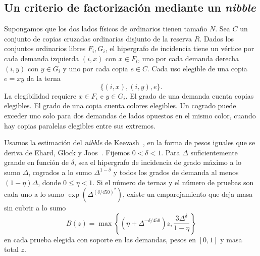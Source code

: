 \subsection{Un criterio de factorización mediante un \emph{nibble}}

Supongamos que los dos lados físicos de ordinarios tienen tamaño \(N\). Sea \(C\) un conjunto de copias cruzadas ordinarias disjunto de la reserva \(R\). Dados los conjuntos ordinarios libres \(F_i,G_i\), el hipergrafo de incidencia tiene un vértice por cada demanda izquierda \((i,x)\) con \(x\in F_i\), uno por cada demanda derecha \((i,y)\) con \(y\in G_i\) y uno por cada copia \(e\in C\). Cada uso elegible de una copia \(e=xy\) da la terna
\[
 \{(i,x),(i,y),e\}.
\]
La elegibilidad requiere \(x\in F_i\) e \(y\in G_i\). El grado de una demanda cuenta copias elegibles. El grado de una copia cuenta colores elegibles. Un cogrado puede exceder uno solo para dos demandas de lados opuestos en el mismo color, cuando hay copias paralelas elegibles entre sus extremos.

Usamos la estimación del \emph{nibble} de Keevash~\cite[Sección~3.1]{KeevashII}, en la forma de pesos iguales que se deriva de Ehard, Glock y Joos~\cite{EGJ}. Fijemos \(0<\delta<1\). Para \(\Delta\) suficientemente grande en función de \(\delta\), sea el hipergrafo de incidencia de grado máximo a lo sumo \(\Delta\), cogrados a lo sumo \(\Delta^{1-\delta}\) y todos los grados de demanda al menos \((1-\eta)\Delta\), donde \(0\le\eta<1\). Si el número de ternas y el número de pruebas son cada uno a lo sumo \(\exp(\Delta^{(\delta/450)^2})\), existe un emparejamiento que deja masa sin cubrir a lo sumo
\[
 B(z)=\max\left\{(\eta+\Delta^{-\delta/450})z,\frac{3\Delta^\delta}{1-\eta}\right\}
 \label{eq:nibble-error}\tag{N}
\]
en cada prueba elegida con soporte en las demandas, pesos en \([0,1]\) y masa total \(z\).

